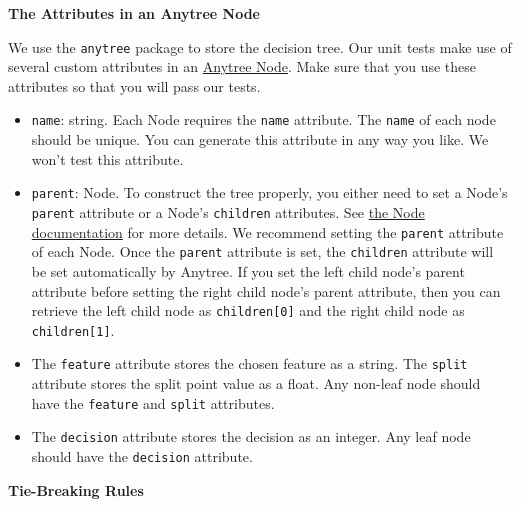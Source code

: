 \documentclass[12pt]{article}
\begin{document}
{\bf The Attributes in an Anytree Node}

We use the \verb+anytree+ package to store the decision tree. Our unit tests make use of several custom attributes in an \href{https://anytree.readthedocs.io/en/latest/api/anytree.node.html#anytree.node.node.Node}{Anytree Node}. Make sure that you use these attributes so that you will pass our tests.

\begin{itemize}

\item \verb+name+: string. Each Node requires the \verb+name+ attribute. The \verb+name+ of each node should be unique.  You can generate this attribute in any way you like. We won't test this attribute.

\item \verb+parent+: Node. To construct the tree properly, you either need to set a Node's \verb+parent+ attribute or a Node's \verb+children+ attributes. See \href{https://anytree.readthedocs.io/en/latest/api/anytree.node.html}{the Node documentation} for more details. We recommend setting the \verb+parent+ attribute of each Node. Once the \verb+parent+ attribute is set, the \verb+children+ attribute will be set automatically by Anytree. If you set the left child node's parent attribute before setting the right child node's parent attribute, then you can retrieve the left child node as \verb+children[0]+ and the right child node as \verb+children[1]+.

\item The \verb+feature+ attribute stores the chosen feature as a string. The \verb+split+ attribute stores the split point value as a float. Any non-leaf node should have the \verb+feature+ and \verb+split+ attributes.

\item The \verb+decision+ attribute stores the decision as an integer. Any leaf node should have the \verb+decision+ attribute.

\end{itemize}

{\bf Tie-Breaking Rules}
\end{document}
